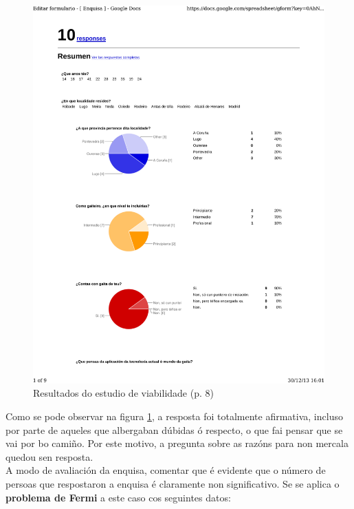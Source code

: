 \begin{figure}[htbp]
 \centering
 \includegraphics[trim=0 12cm 0 11cm,clip=true,scale=0.7,page=8,keepaspectratio=true]{./imagenes/enquisa.pdf}
 \caption{Resultados do estudio de viabilidade (p. 8)}
 \label{figura:ResultadosEstudioViabilidade8}
\end{figure}

Como se pode observar na figura \ref{figura:ResultadosEstudioViabilidade8}, a
resposta foi totalmente afirmativa, incluso por parte de aqueles que albergaban
dúbidas ó respecto, o que fai pensar que se vai por bo camiño. Por este motivo,
a pregunta sobre as razóns para non mercala quedou sen resposta. \\

A modo de avaliación da enquisa, comentar que é evidente que o número de
persoas que respostaron a enquisa é claramente non significativo. Se se aplica
o \textbf{problema de Fermi} \cite{ProblemaFermi} a este caso cos seguintes
datos:

